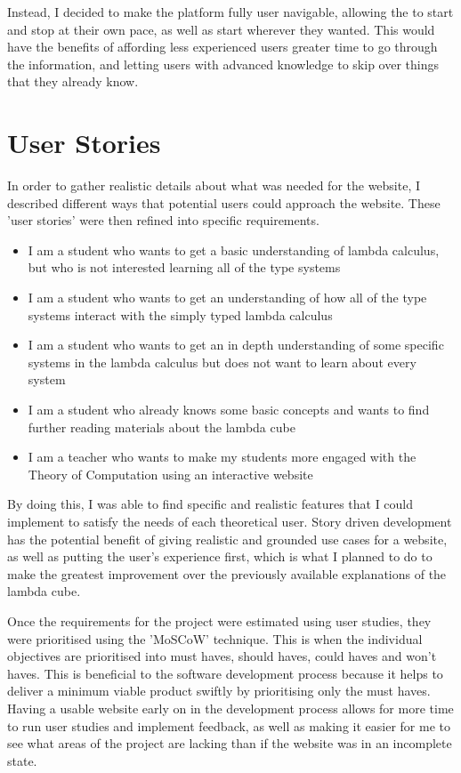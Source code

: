 \documentclass{l4proj}
\begin{document}
Instead, I decided to make the platform fully user navigable, allowing the to start and stop at their own pace, as well as start wherever they wanted.  This would have the benefits of affording less experienced users greater time to go through the information, and letting users with advanced knowledge to skip over things that they already know.

\section{User Stories}
In order to gather realistic details about what was needed for the website, I described different ways that potential users could approach the website.  These 'user stories' were then refined into specific requirements.

\begin{itemize}
    \item 
        I am a student who wants to get a basic understanding of lambda calculus, but who is not interested learning all of the type systems

    \item
        I am a student who wants to get an understanding of how all of the type systems interact with the simply typed lambda calculus

    \item
        I am a student who wants to get an in depth understanding of some specific systems in the lambda calculus but does not want to learn about every system

    \item
        I am a student who already knows some basic concepts and wants to find further reading materials about the lambda cube
    \item 
        I am a teacher who wants to make my students more engaged with the Theory of Computation using an interactive website
\end{itemize}

By doing this, I was able to find specific and realistic features that I could implement to satisfy the needs of each theoretical user.  Story driven development has the potential benefit of giving realistic and grounded use cases for a website, as well as putting the user's experience first, which is what I planned to do to make the greatest improvement over the previously available explanations of the lambda cube. 

Once the requirements for the project were estimated using user studies, they were prioritised using the 'MoSCoW' technique.  This is when the individual objectives are prioritised into must haves, should haves, could haves and won't haves.  This is beneficial to the software development process because it helps to deliver a minimum viable product swiftly by prioritising only the must haves.  Having a usable website early on in the development process allows for more time to run user studies and implement feedback, as well as making it easier for me to see what areas of the project are lacking than if the website was in an incomplete state.  
\end{document}
